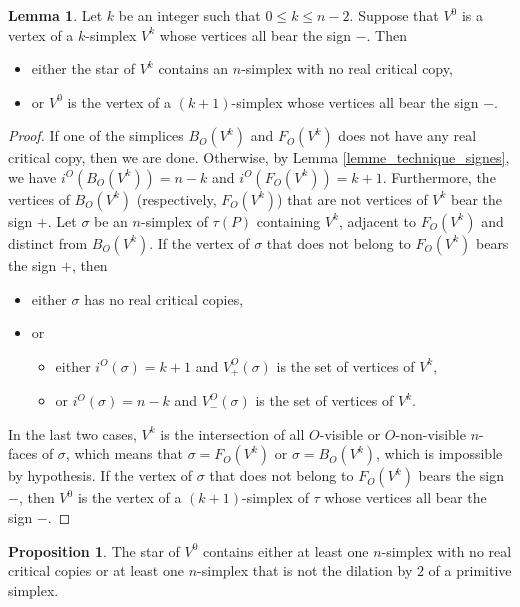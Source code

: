 \documentclass[12pt]{article}
\theoremstyle{definition}
\newtheorem{lem}{Lemma}[section]
\newtheorem{prop}{Proposition}[section]
\begin{document}
\begin{lem}
    \label{lemme_preuve_asympto_simplexes_0_n-2}
    Let $k$ be an integer such that $0 \leq k \leq n-2$.
    Suppose that $V^0$ is a vertex of a $k$-simplex $V^k$ whose vertices all bear the sign $-$. Then
    \begin{itemize}
        \item either the star of $V^k$ contains an $n$-simplex with no real critical copy,
        \item or $V^0$ is the vertex of a $(k+1)$-simplex whose vertices all bear the sign $-$.
    \end{itemize}
\end{lem}

\begin{proof}
    If one of the simplices $B_O(V^k)$ and $F_O(V^k)$ does not have any real critical copy, then we are done. Otherwise, by Lemma \ref{lemme_technique_signes}, we have $i^O(B_O(V^k)) = n-k$ and $i^O(F_O(V^k)) = k+1$. Furthermore, the vertices of $B_O(V^k)$ (respectively, $F_O(V^k)$) that are not vertices of $V^k$ bear the sign $+$. Let $\sigma$ be an $n$-simplex of $\tau(P)$ containing $V^k$, adjacent to $F_O(V^k)$ and distinct from $B_O(V^k)$. If the vertex of $\sigma$ that does not belong to $F_O(V^k)$ bears the sign $+$, then
    \begin{itemize}
        \item either $\sigma$ has no real critical copies,
        \item or
        \begin{itemize}
            \item either $i^O(\sigma) = k+1$ and $V_+^O(\sigma)$ is the set of vertices of $V^k$,
            \item or $i^O(\sigma) = n-k$  and $V_-^O(\sigma)$ is the set of vertices of $V^k$.
        \end{itemize}
    \end{itemize}
    In the last two cases, $V^k$ is the intersection of all $O$-visible or $O$-non-visible $n$-faces of $\sigma$, which means that $\sigma = F_O(V^k)$ or $\sigma = B_O(V^k)$, which is impossible by hypothesis. If the vertex of $\sigma$ that does not belong to $F_O(V^k)$ bears the sign $-$, then $V^0$ is the vertex of a $(k+1)$-simplex of $\tau$ whose vertices all bear the sign $-$.
\end{proof}

\begin{prop}
    \label{prop_preuve_asympto_mauvais_simplexe_dans_chaque_etoile}
    The star of $V^0$ contains either at least one $n$-simplex with no real critical copies or at least one $n$-simplex that is not the dilation by $2$ of a primitive simplex.
\end{prop}
\end{document}
